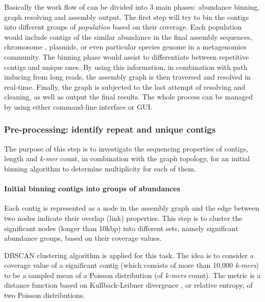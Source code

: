 Basically the work flow of \npgraph{} can be divided into 3 main phases: abundance binning, graph resolving and assembly output. 
The first step will try to bin the contigs into different groups of \emph{population} based on their coverage. 
Each population would include contigs of the similar abundance in the final assembly sequences, \EG{} chromosome , plasmids, or even particular species genome in a metagenomics community.
The binning phase would assist to differentiate between repetitive contigs and unique ones. By using this information, in combination with path inducing from long reads, the assembly graph is then traversed and resolved in real-time. Finally, the graph is subjected to the last attempt of resolving and cleaning, as well as output the final results. The whole process can be managed by using either command-line interface or GUI.
\subsubsection{Pre-processing: identify repeat and unique contigs}
The purpose of this step is to investigate the sequencing properties of contigs, \IE{} length and \emph{k-mer} count, in combination with the graph topology, for an initial binning algorithm to determine multiplicity for each of them.

\paragraph{Initial binning contigs into groups of abundances}
Each contig is represented as a node in the assembly graph and the edge between two nodes indicate their overlap (link) properties.
This step is to cluster the significant nodes (longer than 10kbp) into different sets, namely significant abundance groups, based on their coverage values. 

DBSCAN clustering algorithm \cite{Ester96adensity-based} is applied for this task.
The idea is to consider a coverage value of a significant contig (which consists of more than 10,000 \emph{k-mers}) to be a sampled mean of a Poisson distribution (of \emph{k-mers} count). 
The metric is a distance function based on Kullback-Leibner divergence \cite{Kullback1951information}, or relative entropy, of two Poisson distributions.

